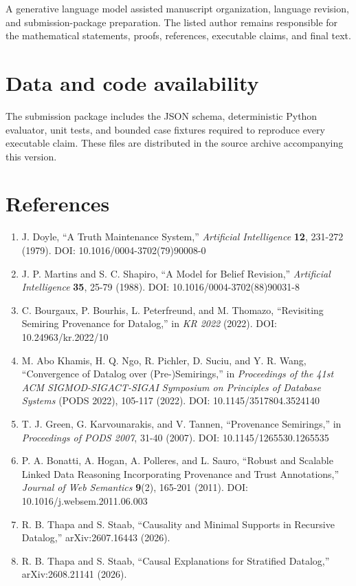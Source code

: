 \documentclass[
  11pt,
]{article}
\providecommand{\tightlist}{%
  \setlength{\itemsep}{0pt}\setlength{\parskip}{0pt}}
\begin{document}
A generative language model assisted manuscript organization, language
revision, and submission-package preparation. The listed author remains
responsible for the mathematical statements, proofs, references,
executable claims, and final text.

\hypertarget{data-and-code-availability}{%
\section{Data and code availability}\label{data-and-code-availability}}

The submission package includes the JSON schema, deterministic Python
evaluator, unit tests, and bounded case fixtures required to reproduce
every executable claim. These files are distributed in the source
archive accompanying this version.

\hypertarget{references}{%
\section{References}\label{references}}

\begin{enumerate}
\def\labelenumi{\arabic{enumi}.}
\tightlist
\item
  J. Doyle, ``A Truth Maintenance System,'' \emph{Artificial
  Intelligence} \textbf{12}, 231-272 (1979). DOI:
  10.1016/0004-3702(79)90008-0
\item
  J. P. Martins and S. C. Shapiro, ``A Model for Belief Revision,''
  \emph{Artificial Intelligence} \textbf{35}, 25-79 (1988). DOI:
  10.1016/0004-3702(88)90031-8
\item
  C. Bourgaux, P. Bourhis, L. Peterfreund, and M. Thomazo, ``Revisiting
  Semiring Provenance for Datalog,'' in \emph{KR 2022} (2022). DOI:
  10.24963/kr.2022/10
\item
  M. Abo Khamis, H. Q. Ngo, R. Pichler, D. Suciu, and Y. R. Wang,
  ``Convergence of Datalog over (Pre-)Semirings,'' in \emph{Proceedings
  of the 41st ACM SIGMOD-SIGACT-SIGAI Symposium on Principles of
  Database Systems} (PODS 2022), 105-117 (2022). DOI:
  10.1145/3517804.3524140
\item
  T. J. Green, G. Karvounarakis, and V. Tannen, ``Provenance
  Semirings,'' in \emph{Proceedings of PODS 2007}, 31-40 (2007). DOI:
  10.1145/1265530.1265535
\item
  P. A. Bonatti, A. Hogan, A. Polleres, and L. Sauro, ``Robust and
  Scalable Linked Data Reasoning Incorporating Provenance and Trust
  Annotations,'' \emph{Journal of Web Semantics} \textbf{9}(2), 165-201
  (2011). DOI: 10.1016/j.websem.2011.06.003
\item
  R. B. Thapa and S. Staab, ``Causality and Minimal Supports in
  Recursive Datalog,'' arXiv:2607.16443 (2026).
\item
  R. B. Thapa and S. Staab, ``Causal Explanations for Stratified
  Datalog,'' arXiv:2608.21141 (2026).
\end{enumerate}
\end{document}
